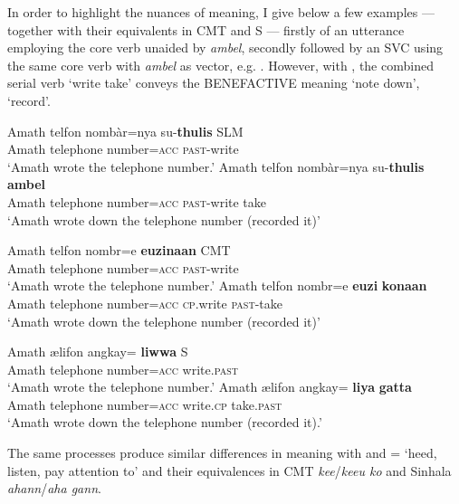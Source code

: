 In order to highlight the nuances of meaning, I give below a few examples --- together with their equivalents in CMT and S --- firstly of an utterance employing the core verb unaided by \textit{ambel}, secondly followed by an SVC using the same core verb with \textit{ambel} as vector, e.g. . However, with , the combined serial verb `write take' conveys the BENEFACTIVE meaning `note down', `record'.

\ea
\ea\label{jaffar:ex:5}
\gll Amath telfon nombàr=nya su-\textbf{thulis} SLM\\
 Amath telephone number=\textsc{acc}  \textsc{past}-write \\
`Amath wrote the telephone number.'
\ex\label{jaffar:ex:6}
\gll Amath telfon nombàr=nya su-\textbf{thulis} \textbf{ambel}\\
Amath telephone number=\textsc{acc}  \textsc{past}-write take\\
`Amath wrote down the telephone number (recorded it)'
\z
\z


\ea
\ea\label{jaffar:ex:7}
\gll Amath telfon nomb{\E}r=e \textbf{e{\textrtaill}uzinaan} CMT\\
 Amath telephone number=\textsc{acc}  \textsc{past}-write\\
`Amath wrote the telephone number.'
\ex%
\gll Amath telfon nomb{\E}r=e \textbf{e{\textrtaill}uzi} \textbf{kon{\dz}aan}\\
Amath telephone number=\textsc{acc}  \textsc{cp}\footnotemark{}.write \textsc{past}-take\\
`Amath wrote down the telephone number (recorded it)'
\z
\z
{}

 

\ea
\ea\label{jaffar:ex:9}
\gll Amath {\textrtailt}{\ae}lifon angkay={\E} \textbf{liwwa} S\\
 Amath telephone number=\textsc{acc}  write.\textsc{past}\\
`Amath wrote the telephone number.'
\ex%
\gll Amath {\textrtailt}{\ae}lifon angkay={\E} \textbf{liya} \textbf{gatta} \\
 Amath telephone number=\textsc{acc}  write.\textsc{cp} take.\textsc{past}\\
`Amath wrote down the telephone number (recorded it).'
\z
\z

The same processes produce similar differences in meaning with  and  = `heed, listen, pay attention to' and their equivalences in   CMT \textit{kee\textrtaill}/\textit{kee{\textrtailt}{\textrtailt}u ko} and Sinhala \textit{ahann{\E}}/\textit{aha gann{\E}}.

